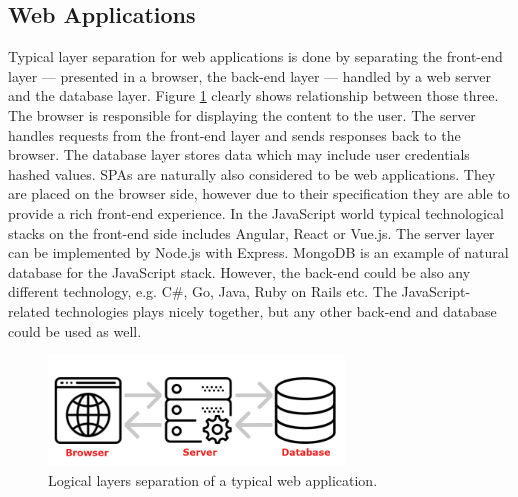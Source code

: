 \documentclass{article} %
\begin{document}
\subsection{Web Applications}
Typical layer separation for web applications is done by separating the front-end layer --- presented in a browser, the back-end layer --- handled by a web server and the database layer. Figure \ref{fig:web_application_layers} clearly shows relationship between those three. The browser is responsible for displaying the content to the user. The server handles requests from the front-end layer and sends responses back to the browser. The database layer stores data which may include user credentials hashed values. SPAs are naturally also considered to be web applications. They are placed on the browser side, however due to their specification they are able to provide a rich front-end experience. In the JavaScript world typical technological stacks on the front-end side includes Angular, React or Vue.js. The server layer can be implemented by Node.js with Express. MongoDB is an example of natural database for the JavaScript stack. However, the back-end could be also any different technology, e.g. C\#, Go, Java, Ruby on Rails etc. The JavaScript-related technologies plays nicely together, but any other back-end and database could be used as well.
\begin{figure}[ht]
  \centering
      \includegraphics[width=0.7\textwidth]{web_applications.png}
  \caption{Logical layers separation of a typical web application.}
  \label{fig:web_application_layers}
\end{figure}
\end{document}
